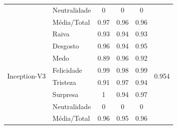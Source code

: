 \begin{table}[]
\begin{tabular}{llcccc}
                                       & Neutralidade          & 0                                     & 0                                      & 0                                     &                                       \\
                                       & Média/Total           & 0.97                                  & 0.96                                   & 0.96                                  &                                       \\ \hline
\multirow{8}{*}{Inception-V3}     & Raiva                 & 0.93                                  & 0.94                                   & 0.93                                  & \multirow{8}{*}{0.954}                \\
                                       & Desgosto              & 0.96                                  & 0.94                                   & 0.95                                  &                                       \\
                                       & Medo                  & 0.89                                  & 0.96                                   & 0.92                                  &                                       \\
                                       & Felicidade            & 0.99                                  & 0.98                                   & 0.99                                  &                                       \\
                                       & Tristeza              & 0.91                                  & 0.97                                   & 0.94                                  &                                       \\
                                       & Surpresa              & 1                                     & 0.94                                   & 0.97                                  &                                       \\
                                       & Neutralidade          & 0                                     & 0                                      & 0                                     &                                       \\
                                       & Média/Total           & 0.96                                  & 0.95                                   & 0.96                                  &                                       \\ \hline

\end{tabular}
\end{table}
